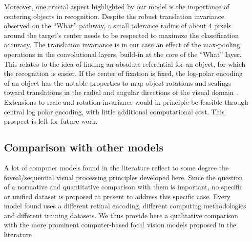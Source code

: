 Moreover, one crucial aspect highlighted by our model is the importance of centering objects in recognition. Despite the robust translation invariance observed on the ``What'' pathway, a small tolerance radius of about $4$ pixels around the target's center needs to be respected to maximize the classification accuracy. The translation invariance is in our case an effect of the max-pooling operations in the convolutional layers, build-in at the core of the ``What'' layer.
This relates to the idea of finding an absolute referential for an object, for which the recognition is easier. If the center of fixation is fixed, the log-polar encoding of an object has the notable properties to map object rotations and scalings toward translations in the radial and angular directions of the visual domain~\cite{Traver10}. Extensions to scale and rotation invariance would in principle be feasible through central log polar encoding, with little additional computational cost. This prospect is left for future work.



\subsection{Comparison with other models}

A lot of computer models found in the literature reflect to some degree the foveal/sequential visual processing principles developed here.
Since the question of a normative and quantitative comparison with them is important, no specific or unified dataset is proposed at present
to address this specific case. Every model found uses a different retinal encoding, different computing methodologies and different training datasets.
We thus provide here a qualitative comparison with the more prominent computer-based focal vision models proposed in the literature




